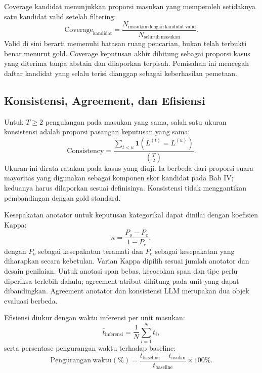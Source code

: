 Coverage kandidat menunjukkan proporsi masukan yang memperoleh setidaknya satu kandidat valid setelah filtering:
\begin{equation}
 \mathrm{Coverage}_{\mathrm{kandidat}}=\frac{N_{\mathrm{masukan\ dengan\ kandidat\ valid}}}{N_{\mathrm{seluruh\ masukan}}}.
 \label{eq:coverage}
\end{equation}
 Valid di sini berarti memenuhi batasan ruang pencarian, bukan telah terbukti benar menurut gold. Coverage keputusan akhir dihitung sebagai proporsi kasus yang diterima tanpa abstain dan dilaporkan terpisah. Pemisahan ini mencegah daftar kandidat yang selalu terisi dianggap sebagai keberhasilan pemetaan.

\subsection{Konsistensi, Agreement, dan Efisiensi}

Untuk $T\geq2$ pengulangan pada masukan yang sama, salah satu ukuran konsistensi adalah proporsi pasangan keputusan yang sama:
\begin{equation}
 \mathrm{Consistency}=\frac{\sum_{t<u}\mathbf{1}(L^{(t)}=L^{(u)})}{\binom{T}{2}}.
 \label{eq:consistency}
\end{equation}
 Ukuran ini dirata-ratakan pada kasus yang diuji. Ia berbeda dari proporsi suara mayoritas yang digunakan sebagai komponen skor kandidat pada Bab IV; keduanya harus dilaporkan sesuai definisinya. Konsistensi tidak menggantikan pembandingan dengan gold standard.

Kesepakatan anotator untuk keputusan kategorikal dapat dinilai dengan koefisien Kappa:
\begin{equation}
 \kappa=\frac{P_o-P_e}{1-P_e},
 \label{eq:kappa}
\end{equation}
 dengan $P_o$ sebagai kesepakatan teramati dan $P_e$ sebagai kesepakatan yang diharapkan secara kebetulan. Varian Kappa dipilih sesuai jumlah anotator dan desain penilaian. Untuk anotasi span bebas, kecocokan span dan tipe perlu diperiksa terlebih dahulu; agreement atribut dihitung pada unit yang dapat dibandingkan. Agreement anotator dan konsistensi LLM merupakan dua objek evaluasi berbeda.

Efisiensi diukur dengan waktu inferensi per unit masukan:
\begin{equation}
 \bar{t}_{\mathrm{inferensi}}=\frac{1}{N}\sum_{i=1}^{N}t_i,
 \label{eq:efficiency-time}
\end{equation}
 serta persentase pengurangan waktu terhadap baseline:
\begin{equation}
 \mathrm{Pengurangan\ waktu}(\%)=\frac{t_{\mathrm{baseline}}-t_{\mathrm{usulan}}}{t_{\mathrm{baseline}}}\times100\%.
 \label{eq:speedup}
\end{equation}

